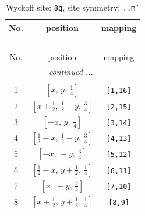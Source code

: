 \documentclass[fleqn,8pt]{jsarticle}
\begin{document}
\begin{longtable}{ccc}
\caption{Wyckoff site: {\tt 8g}, site symmetry: {\tt ..m'}}
 \\
 \hline \hline
No. & position & mapping \\ \hline \endfirsthead

\multicolumn{2}{l}{\tablename\ \thetable{}} \\
 \hline \hline
No. & position & mapping \\ \hline \endhead

 \hline \hline
\multicolumn{2}{r}{\footnotesize\it continued ...} \\ \endfoot

 \hline \hline
\multicolumn{2}{r}{} \\ \endlastfoot

1 & $\left[ x,\, y,\, \frac{1}{4} \right]$ & {\tt [1,16]} \\ \hline
2 & $\left[ x + \frac{1}{2},\, \frac{1}{2} - y,\, \frac{3}{4} \right]$ & {\tt [2,15]} \\ \hline
3 & $\left[ - x,\, y,\, \frac{1}{4} \right]$ & {\tt [3,14]} \\ \hline
4 & $\left[ \frac{1}{2} - x,\, \frac{1}{2} - y,\, \frac{3}{4} \right]$ & {\tt [4,13]} \\ \hline
5 & $\left[ - x,\, - y,\, \frac{3}{4} \right]$ & {\tt [5,12]} \\ \hline
6 & $\left[ \frac{1}{2} - x,\, y + \frac{1}{2},\, \frac{1}{4} \right]$ & {\tt [6,11]} \\ \hline
7 & $\left[ x,\, - y,\, \frac{3}{4} \right]$ & {\tt [7,10]} \\ \hline
8 & $\left[ x + \frac{1}{2},\, y + \frac{1}{2},\, \frac{1}{4} \right]$ & {\tt [8,9]} \\
\end{longtable}
\renewcommand{\arraystretch}{1.2}
\end{document}
